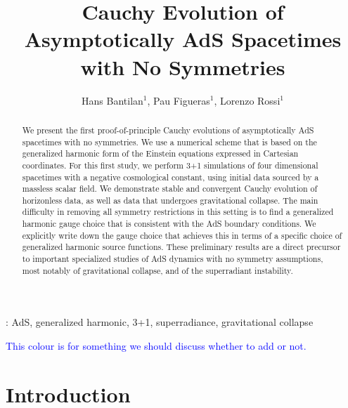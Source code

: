 \documentclass[12pt]{iopart} %
\begin{document}
\title[]{Cauchy Evolution of Asymptotically AdS Spacetimes with No Symmetries}

\author{Hans Bantilan$^1$, Pau Figueras$^1$, Lorenzo Rossi$^1$}
\address{$^1$ School of Mathematical Sciences, Queen Mary University of
  London, \\ Mile End Road, London E1 4NS, United Kingdom}

\begin{abstract}
We present the first proof-of-principle Cauchy evolutions of asymptotically AdS spacetimes with no symmetries.
We use a numerical scheme that is based on the generalized harmonic form of the Einstein equations expressed in Cartesian coordinates.
For this first study, we perform 3+1 simulations of four dimensional spacetimes with a negative cosmological constant, using initial data sourced by a massless scalar field.
We demonstrate stable and convergent Cauchy evolution of horizonless data, as well as data that undergoes gravitational collapse.
The main difficulty in removing all symmetry restrictions in this setting is to find a generalized harmonic gauge choice that is consistent with the AdS boundary conditions.
We explicitly write down the gauge choice that achieves this in terms of a specific choice of generalized harmonic source functions.
These preliminary results are a direct precursor to important specialized studies of AdS dynamics with no symmetry assumptions, most notably of gravitational collapse, and of the superradiant instability.
\end{abstract}


: AdS, generalized harmonic, 3+1, superradiance, gravitational collapse

\textcolor{blue}{This colour is for something we should discuss whether to add or not.}

%
% 




\section{Introduction}
\end{document}
